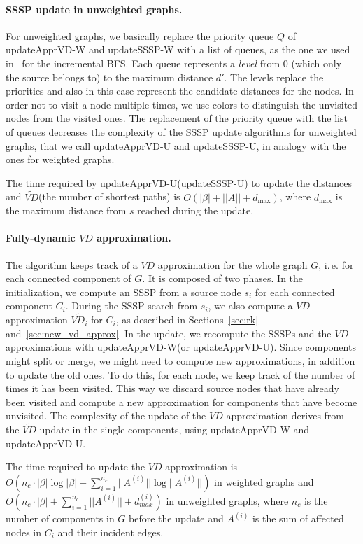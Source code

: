 \documentclass[english]{llncs}
\newcommand{\ie}{i.\,e.\xspace}
\newcommand{\vd}{$\mathit{VD}$\xspace}
\newcommand{\vda}{$\tilde{\mathit{VD}}$\xspace}
\newcommand{\upvd}{\textsf{updateApprVD-W}\xspace}
\newcommand{\sssp}{\textsf{updateSSSP-W}\xspace}
\newcommand{\upvdu}{\textsf{updateApprVD-U}\xspace}
\newcommand{\ssspu}{\textsf{updateSSSP-U}\xspace}
\begin{document}
\paragraph{SSSP update in unweighted graphs.}
For unweighted graphs, we basically replace the priority queue $Q$ of \upvd and \sssp with a list of queues, as the one we used in~\cite{DBLP:conf/alenex/BergaminiMS15} for the incremental BFS. Each queue represents a \emph{level} from 0 (which only the source belongs to) to the maximum distance $d'$. The levels replace the priorities and also in this case represent the candidate distances for the nodes. In order not to visit a node multiple times, we use colors to distinguish the unvisited nodes from the visited ones. The replacement of the priority queue with the list of queues decreases the complexity of the SSSP update algorithms for unweighted graphs, that we call \upvdu and \ssspu, in analogy with the ones for weighted graphs.
\begin{lemma}
\label{thm:complexity2}
The time required by \upvdu (\ssspu) to update the distances and \vda (the number of shortest paths) is $O(|\beta |+ ||A ||+d_{\max})$, where $d_{\max}$ is the maximum distance from $s$ reached during the update.
\end{lemma}
\paragraph{Fully-dynamic \vd approximation.}
The algorithm keeps track of a \vd approximation for the whole graph $G$, \ie for each connected component of $G$. It is composed of two phases. In the initialization, we compute an SSSP from a source node $s_i$ for each connected component $C_i$. During the SSSP search from $s_i$, we also compute a \vd approximation $\tilde{\mathit{VD}_i}$ for $C_i$, as described in Sections~\ref{sec:rk} and~\ref{sec:new_vd_approx}. In the update, we recompute the SSSPs and the \vd approximations with \upvd (or \upvdu). Since components might split or merge, we might need to compute new approximations, in addition to update the old ones. To do this, for each node, we keep track of the number of times it has been visited. This way we discard source nodes that have already been visited and compute a new approximation for components that have become unvisited. The complexity of the update of the \vd approximation derives from the \vda update in the single components, using \upvd and \upvdu.
\begin{theorem}
\label{thm:complexity_vd}
The time required to update the \vd approximation is $O(n_c\cdot |\beta |\log |\beta |+\sum_{i=1}^{n_c}||A^{(i)}|| \log ||A^{(i)}||)$ in weighted graphs and $O(n_c\cdot |\beta |+\sum_{i=1}^{n_c}||A^{(i)}||+d^{(i)}_{max})$ in unweighted graphs, where $n_c$ is the number of components in $G$ before the update and $A^{(i)}$ is the sum of affected nodes in $C_i$ and their incident edges.
\end{theorem}
\end{document}
